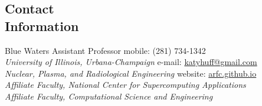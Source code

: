 \documentclass[margin,line]{resume}
\begin{document}
\begin{resume}

%


    \section{\mysidestyle Contact\\Information}
    Blue Waters Assistant Professor \hfill mobile: (281) 734-1342 \vspace{0mm}\\\vspace{0mm}%
        \textsl{University of Illinois, Urbana-Champaign}
        \hfill e-mail: \href{mailto:katyhuff@gmail.com}{katyhuff@gmail.com}       \vspace{0mm}\\\vspace{0mm}%
    \textsl{Nuclear, Plasma, and Radiological Engineering}
        \hfill website: \href{https://arfc.github.io}{arfc.github.io}     \vspace{0mm}\\\vspace{0mm}%
    \textsl{Affiliate Faculty, National Center for Supercomputing Applications}           \vspace{0mm}\\\vspace{0mm}%
    \textsl{Affiliate Faculty, Computational Science and Engineering}           \vspace{0mm}\\\vspace{-4.5mm}%


\end{resume}
\end{document}

